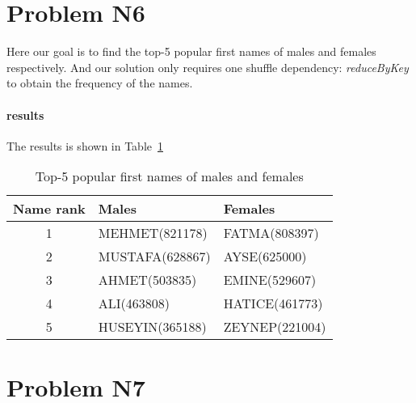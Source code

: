 \documentclass{article}
\begin{document}
\section{Problem N6}

Here our goal is to find the top-5 popular first names of males and females respectively. And our solution only requires one shuffle dependency: \emph{reduceByKey} to obtain the frequency of the names.

\paragraph{results}

The results is shown in Table~\ref{tab-1}

\begin{table}[ht]
\centering
\caption{Top-5 popular first names of males and females}
\label{tab-1}
\begin{tabular}{cll}
\toprule
Name rank & Males & Females \\
\midrule
1 & MEHMET(821178) & FATMA(808397)  \\
2 & MUSTAFA(628867) & AYSE(625000) \\
3 & AHMET(503835) & EMINE(529607) \\
4 & ALI(463808) & HATICE(461773) \\
5 & HUSEYIN(365188) & ZEYNEP(221004) \\
\bottomrule
\end{tabular}
\end{table}


\section{Problem N7}
\end{document}
